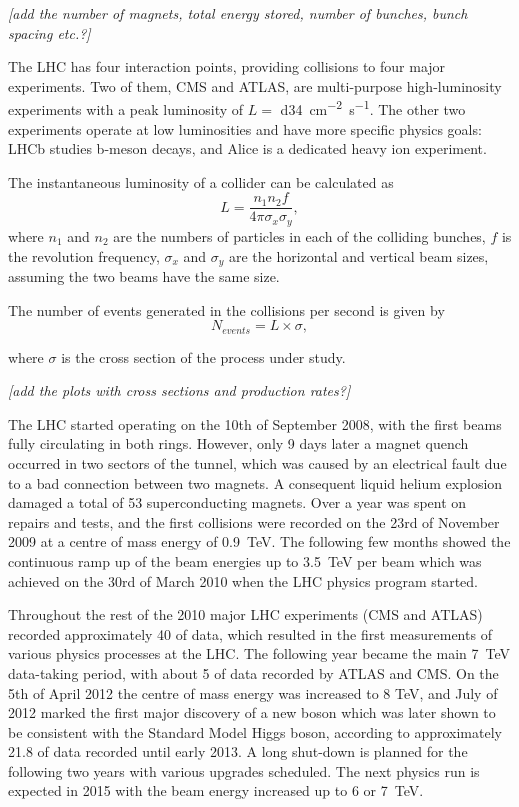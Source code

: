 \textit{[add the number of magnets, total energy stored, number of bunches, bunch spacing etc.?]}

The LHC has four interaction points, providing collisions to four major experiments. Two of them, CMS and ATLAS, are
multi-purpose high-luminosity experiments with a peak luminosity of $L = $ \SI{d34}{\cm^{-2} s^{-1}}. The other two
experiments operate at low luminosities and have more specific physics goals: LHCb studies b-meson decays, and Alice is
a dedicated heavy ion experiment.

The instantaneous luminosity of a collider can be calculated as
\begin{equation}
	L = \frac{n_1 n_2 f}{4 \pi \sigma_x \sigma_y},
\end{equation}
where $n_1$ and $n_2$ are the numbers of particles in each of the colliding bunches, $f$ is the revolution frequency,
$\sigma_x$ and $\sigma_y$ are the horizontal and vertical beam sizes, assuming the two beams have the same size.

The number of events generated in the collisions per second is given by
\begin{equation}
	N_{events} = L \times \sigma,
\end{equation}

where $\sigma$ is the cross section of the process under study.

\textit{[add the plots with cross sections and production rates?]}

The LHC started operating on the 10th of September 2008, with the first beams fully circulating in both rings. However,
only 9 days later a magnet quench occurred in two sectors of the tunnel, which was caused by an electrical fault due to
a bad connection between two magnets. A consequent liquid helium explosion damaged a total of 53 superconducting
magnets. Over a year was spent on repairs and tests, and the first collisions were recorded on the 23rd of November 2009
at a centre of mass energy of \SI{0.9}{\TeV}. The following few months showed the continuous ramp up of the beam
energies up to \SI{3.5}{\TeV} per beam which was achieved on the 30rd of March 2010 when the LHC physics program
started.

Throughout the rest of the 2010 major LHC experiments (CMS and ATLAS) recorded approximately \SI{40}{\invpb} of data,
which resulted in the first measurements of various physics processes at the LHC. The following year became the main
\SI{7}{\TeV} data-taking period, with about \SI{5}{\invfb} of data recorded by ATLAS and CMS. On the 5th of April 2012
the centre of mass energy was increased to 8 TeV, and July of 2012 marked the first major discovery of a new boson which
was later shown to be consistent with the Standard Model Higgs boson, according to approximately \SI{21.8}{\invfb} of
data recorded until early 2013. A long shut-down is planned for the following two years with various upgrades scheduled.
The next physics run is expected in 2015 with the beam energy increased up to 6 or \SI{7}{\TeV}.

